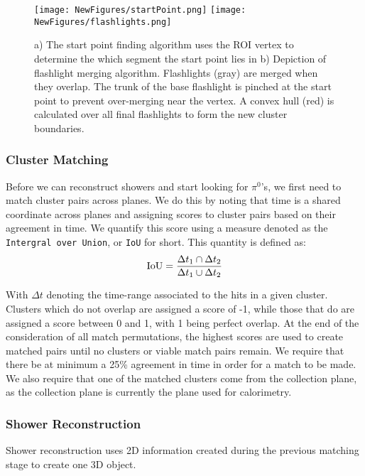 \documentclass[12pt]{article}
\begin{document}
\begin{figure}[h!]
\centering
\texttt{[image: NewFigures/startPoint.png]}
\hspace{3 mm}
\texttt{[image: NewFigures/flashlights.png]}
\caption{a) The start point finding algorithm uses the ROI vertex to determine the which segment the start point lies in   b) Depiction of flashlight merging algorithm. Flashlights (gray) are merged when they overlap. The trunk of the base flashlight is pinched at the start point to prevent over-merging near the vertex. A convex hull (red) is calculated over all final flashlights to form the new cluster boundaries. }
\label{fig:flashlights}
\end{figure}

\subsubsection{Cluster Matching}
Before we can reconstruct showers and start looking for $\pi^0$'s, we first need to match cluster pairs across planes. We do this by noting that time is a shared coordinate across planes and assigning scores to cluster pairs based on their agreement in time. We quantify this score using a measure denoted as the \texttt{Intergral over Union}, or \texttt{IoU} for short. This quantity is defined as:
\begin{equation}
  {\rm IoU} = \frac{ \Delta t_1 \cap \Delta t_2  }{ \Delta t_1 \cup \Delta t_2 }
\end{equation}

With $\Delta t$ denoting the time-range associated to the hits in a given cluster.  Clusters which do not overlap are assigned a score of -1, while those that do are assigned a score between 0 and 1, with 1 being perfect overlap. At the end of the consideration of all match permutations, the highest scores are used to create matched pairs until no clusters or viable match pairs remain. We require that there be at minimum a 25\% agreement in time in order for a match to be made. We also require that one of the matched clusters come from the collection plane, as the collection plane is currently the plane used for calorimetry. 

\subsubsection{Shower Reconstruction}
Shower reconstruction uses 2D information created during the previous matching stage to create one 3D object. 
\end{document}
